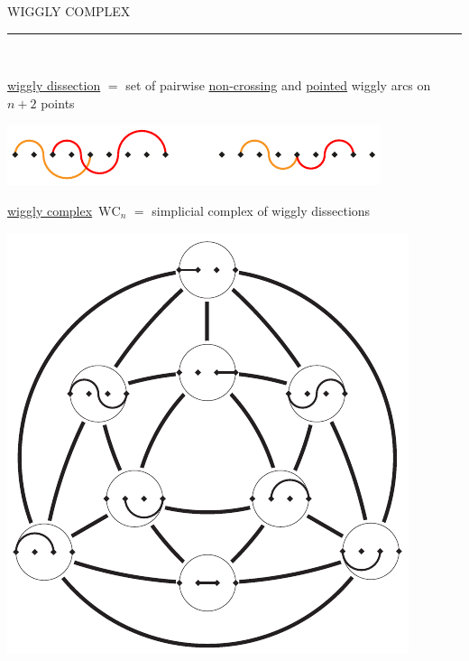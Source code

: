\documentclass[12pt,titlepage,landscape,a4paper]{article}
\newcommand{\textemoyen}{\fontsize{23}{27}\selectfont}
\newenvironment{slide}[1]
{
\newpage
\begin{center}
{\blue \textemoyen \uppercase{#1}}\\
\end{center}
\vspace{-1cm}
\rule{\textwidth}{0.5 pt}\\
\vspace{-.8cm}
}
{\vspace*{-3cm}}
\newcommand{\gboite}[1]
{
\vspace*{.5cm}
\fcolorbox{blue}{grisclair}{
\begin{minipage}{.97\linewidth}
\vspace*{.3cm}
#1
\vspace{.3cm}
\end{minipage}
}
}
\newcommand{\blue}{\color{blue}} %
\newcommand{\theo}[2]{\gboite{{\blue \fontsize{18}{25}\selectfont #1.} #2}}
\renewcommand{\emph}[1]{\uline{#1}}
\newcommand{\wigglyComplex}{\mathrm{WC}} %
\begin{document}
\begin{slide}{Wiggly complex}

\emph{wiggly dissection} $=$ set of pairwise \emph{non-crossing} and \emph{pointed} wiggly arcs on $n+2$ points

\hspace{9.3cm}\includegraphics[scale=1.7]{incompatible}

\vspace{.2cm}
\emph{wiggly complex}~$\wigglyComplex_n$ $=$ simplicial complex of wiggly dissections

\vspace{.2cm}
\centerline{\includegraphics[scale=1.7]{wigglyComplex}}


\end{slide}

\end{document}
